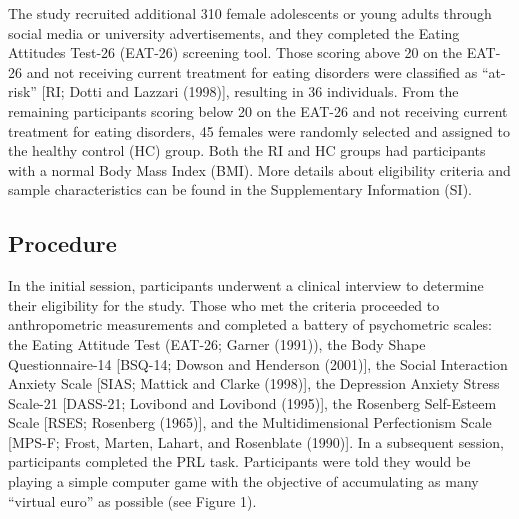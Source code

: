 \documentclass[
  man,floatsintext]{apa6}
\begin{document}
The study recruited additional 310 female adolescents or young adults through social media or university advertisements, and they completed the Eating Attitudes Test-26 (EAT-26) screening tool. Those scoring above 20 on the EAT-26 and not receiving current treatment for eating disorders were classified as ``at-risk'' {[}RI; Dotti and Lazzari (1998){]}, resulting in 36 individuals. From the remaining participants scoring below 20 on the EAT-26 and not receiving current treatment for eating disorders, 45 females were randomly selected and assigned to the healthy control (HC) group. Both the RI and HC groups had participants with a normal Body Mass Index (BMI). More details about eligibility criteria and sample characteristics can be found in the Supplementary Information (SI).

\hypertarget{procedure}{%
\subsection{Procedure}\label{procedure}}

In the initial session, participants underwent a clinical interview to determine their eligibility for the study. Those who met the criteria proceeded to anthropometric measurements and completed a battery of psychometric scales: the Eating Attitude Test (EAT-26; Garner (1991)), the Body Shape Questionnaire-14 {[}BSQ-14; Dowson and Henderson (2001){]}, the Social Interaction Anxiety Scale {[}SIAS; Mattick and Clarke (1998){]}, the Depression Anxiety Stress Scale-21 {[}DASS-21; Lovibond and Lovibond (1995){]}, the Rosenberg Self-Esteem Scale {[}RSES; Rosenberg (1965){]}, and the Multidimensional Perfectionism Scale {[}MPS-F; Frost, Marten, Lahart, and Rosenblate (1990){]}. In a subsequent session, participants completed the PRL task. Participants were told they would be playing a simple computer game with the objective of accumulating as many ``virtual euro'' as possible (see Figure 1).
\end{document}
